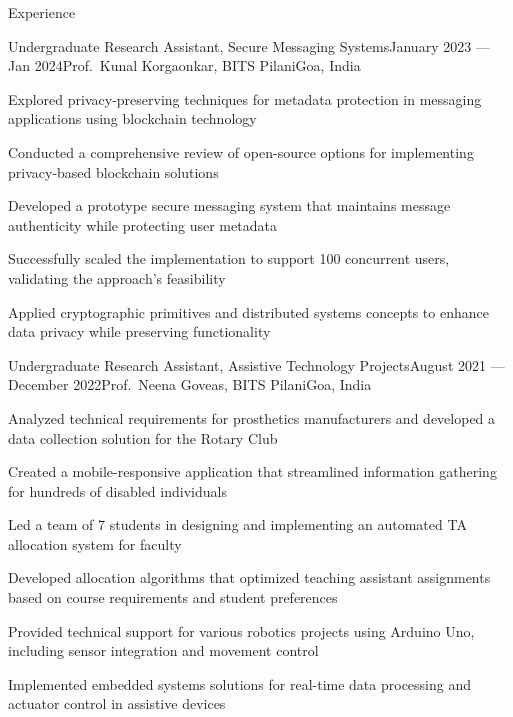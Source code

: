 
\begin{rSection}{Experience}

    \begin{rSubsection}{Undergraduate Research Assistant, Secure Messaging Systems}{January 2023 --- Jan 2024}{Prof.\ Kunal Korgaonkar, BITS Pilani}{Goa, India}
        \item Explored privacy-preserving techniques for metadata protection in messaging applications using blockchain technology
        \item Conducted a comprehensive review of open-source options for implementing privacy-based blockchain solutions
        \item Developed a prototype secure messaging system that maintains message authenticity while protecting user metadata
        \item Successfully scaled the implementation to support 100 concurrent users, validating the approach's feasibility
        \item Applied cryptographic primitives and distributed systems concepts to enhance data privacy while preserving functionality
    \end{rSubsection}
    
    \begin{rSubsection}{Undergraduate Research Assistant, Assistive Technology Projects}{August 2021 --- December 2022}{Prof.\ Neena Goveas, BITS Pilani}{Goa, India}
        \item Analyzed technical requirements for prosthetics manufacturers and developed a data collection solution for the Rotary Club
        \item Created a mobile-responsive application that streamlined information gathering for hundreds of disabled individuals
        \item Led a team of 7 students in designing and implementing an automated TA allocation system for faculty
        \item Developed allocation algorithms that optimized teaching assistant assignments based on course requirements and student preferences
        \item Provided technical support for various robotics projects using Arduino Uno, including sensor integration and movement control
        \item Implemented embedded systems solutions for real-time data processing and actuator control in assistive devices
    \end{rSubsection}
    
    \end{rSection}